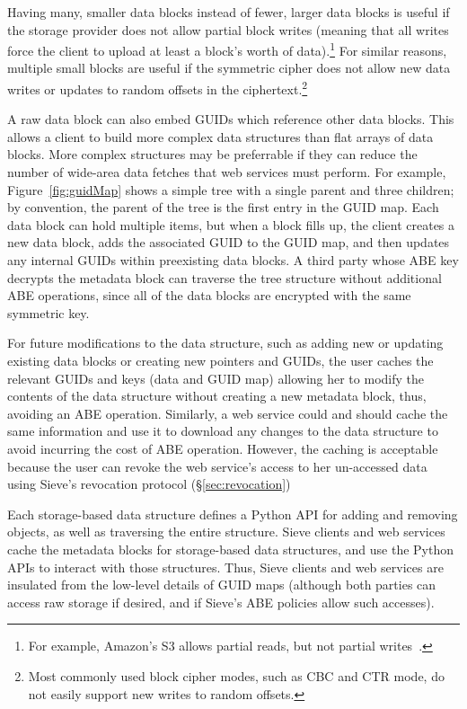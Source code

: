 Having many, smaller data blocks instead of
fewer, larger data blocks is useful if the
storage provider does not allow partial block
writes (meaning that all writes force the
client to upload at least a block's worth of
data).\footnote{For example, Amazon's S3
allows partial reads, but not partial writes~\cite{AmazonPUT}.} %
For similar reasons, multiple small blocks
are useful if the symmetric cipher does
not allow new data writes or 
updates to random offsets in the
ciphertext.\footnote{Most commonly used 
block cipher modes, such as CBC and CTR mode,
do not easily support new writes to random offsets.}

A raw data block can also embed GUIDs which
reference other data blocks. This allows
a client to build more complex data structures
than flat arrays of data blocks.
More complex structures may be preferrable
if they can reduce the number of wide-area
data fetches that web services must perform.
For example, Figure~\ref{fig:guidMap} shows
a simple tree with a single parent and three
children; by convention, the parent of the
tree is the first entry in the GUID map. Each
data block can hold multiple items, but when
a block fills up, the client creates a new
data block, adds the associated GUID to
the GUID map, and then updates any internal
GUIDs within preexisting data blocks. A third
party whose ABE key decrypts the metadata block
can traverse the tree structure without
additional ABE operations, since all of the
data blocks are encrypted with the same
symmetric key. 

For future modifications to the data structure,
such as adding new or updating existing data
blocks or creating new pointers and GUIDs,
the user caches the relevant GUIDs and keys
(data and GUID map) allowing her to modify
the contents of the data structure without
creating a new metadata block, thus,
avoiding an ABE operation. Similarly, a web
service could and should cache the same information
and use it to download any changes to the data 
structure to avoid incurring the cost of ABE 
operation. However, the caching is acceptable
because the user can revoke the web service's
access to her un-accessed data using Sieve's
revocation protocol (\S\ref{sec:revocation})

Each storage-based data structure defines a
Python API for adding and removing objects,
as well as traversing the entire structure.
Sieve clients and web services cache the
metadata blocks for storage-based data
structures, and use the Python APIs to
interact with those structures. Thus, Sieve
clients and web services are insulated from
the low-level details of GUID maps (although
both parties can access raw storage if desired,
and if Sieve's ABE policies allow such accesses).

